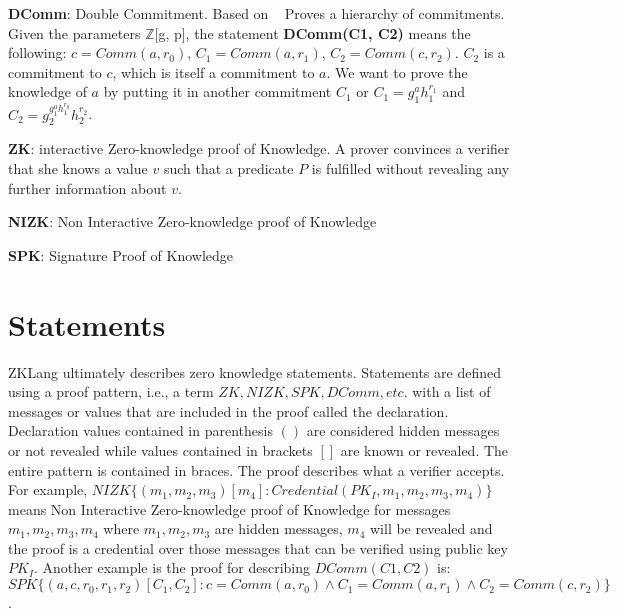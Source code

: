 \documentclass[a4paper]{article}
\begin{document}
\textbf{DComm}: Double Commitment. Based on ~\cite[Appendix]{MiersG0R13} Proves a hierarchy of commitments. Given the parameters $\mathbb{Z}$[g, p], the statement \textbf{DComm(C1, C2)} means the following:
$c=Comm(a, r_0)$, $C_1=Comm(a, r_1)$, $C_2=Comm(c, r_2)$. $C_2$ is a commitment to $c$, which is itself a commitment to $a$. We want to prove the knowledge of $a$ by putting it in another commitment $C_1$ or $C_1 = g_1^a h_1^{r_1}$ and $C_2 = g_2^{g_1^{a} h_1^{r_0}} h_2^{r_2}$.\newline

\textbf{ZK}: interactive Zero-knowledge proof of Knowledge. A prover convinces a verifier that she knows a value $v$ such that a predicate $P$ is fulfilled without revealing any further information about $v$.\newline

\textbf{NIZK}: Non Interactive Zero-knowledge proof of Knowledge\newline

\textbf{SPK}: Signature Proof of Knowledge\newline

\section{Statements}
ZKLang ultimately describes zero knowledge statements. Statements are defined using a proof pattern, i.e., a term $ZK, NIZK, SPK, DComm, etc.$ with a list of messages or values that are included in the proof called the declaration. Declaration values contained in parenthesis $()$ are considered hidden messages or not revealed while values contained in brackets $[]$ are known or revealed. The entire pattern is contained in braces. The proof describes what a verifier accepts. For example, $NIZK\{(m_1, m_2, m_3)[m_4]: Credential(PK_I, m_1, m_2, m_3, m_4)\}$ means Non Interactive Zero-knowledge proof of Knowledge for messages $m_1, m_2, m_3, m_4$ where $m_1, m_2, m_3$ are hidden messages, $m_4$ will be revealed and the proof is a credential over those messages that can be verified using public key $PK_I$. Another example is the proof for describing $DComm(C1, C2)$ is: $SPK\{(a, c, r_0, r_1, r_2)[C_1, C_2]: c=Comm(a, r_0) \wedge C_1 = Comm(a, r_1) \wedge C_2 = Comm(c, r_2)\}$. \newline



\end{document}
